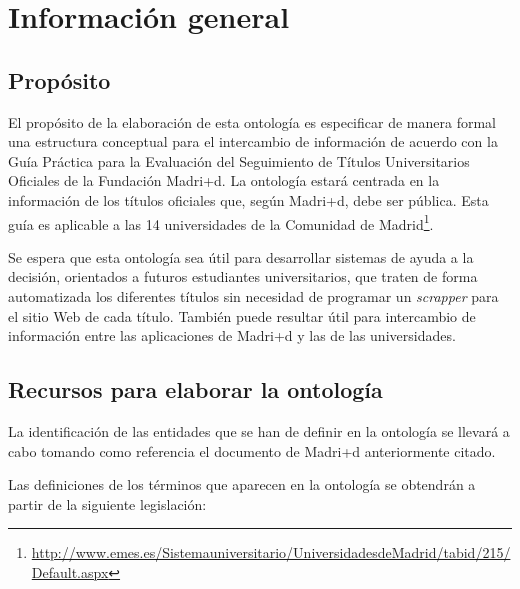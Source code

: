 
\sloppy %

\chapter{Información general}

\section{Propósito}

El propósito de la elaboración de esta ontología es especificar de manera
formal una estructura conceptual para el intercambio de información de acuerdo
con la Guía Práctica para la Evaluación del Seguimiento de Títulos
Universitarios Oficiales de la Fundación Madri+d\cite{guiaMadridMasD}.
La ontología estará centrada en la información de los títulos oficiales que,
según Madri+d, debe ser pública. Esta guía es aplicable a las 14
universidades de la Comunidad de
Madrid\footnote{\url{http://www.emes.es/Sistemauniversitario/UniversidadesdeMadrid/tabid/215/Default.aspx}}.

Se espera que esta ontología sea útil para desarrollar sistemas de ayuda a la
decisión, orientados a futuros estudiantes universitarios, que traten de forma
automatizada los diferentes títulos sin necesidad de programar un
\emph{scrapper} para el sitio Web de cada título. También puede resultar útil
para intercambio de información entre las aplicaciones de Madri+d y las de las
universidades.

\section{Recursos para elaborar la ontología}

La identificación de las entidades que se han de definir en la ontología se
llevará a cabo tomando como referencia el documento de Madri+d anteriormente
citado\cite{guiaMadridMasD}.

Las definiciones de los términos que aparecen en la ontología se obtendrán a
partir de la siguiente legislación:

